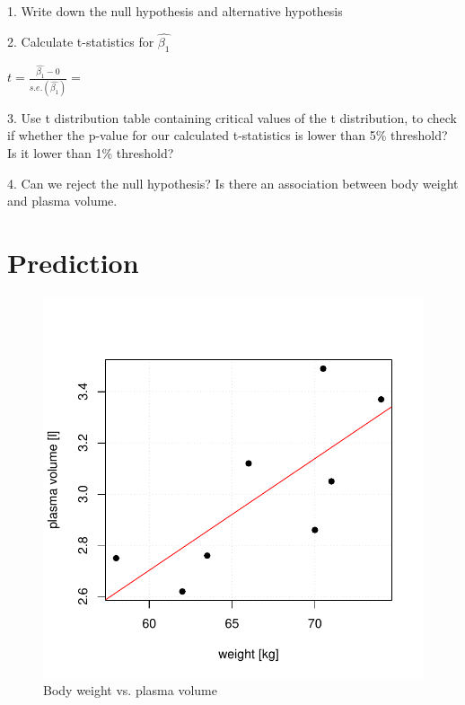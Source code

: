 \documentclass[12pt]{article}\usepackage[]{graphicx}\usepackage[]{color}
\makeatletter
\def\maxwidth{ %
  \ifdim\Gin@nat@width>\linewidth
    \linewidth
  \else
    \Gin@nat@width
  \fi
}
\newenvironment{knitrout}{}{} %
\makeatother
\begin{document}
1. Write down the null hypothesis and alternative hypothesis

2. Calculate t-statistics for $\hat{\beta_1}$ \newline

$t=\frac{\hat{\beta_1}-0}{s.e.(\hat{\beta_1})} = $
\vspace{0.2cm}

3. Use t distribution table containing critical values of the t distribution, to check if whether the p-value for our calculated t-statistics is lower than 5\% threshold? Is it lower than 1\% threshold?

4. Can we reject the null hypothesis? Is there an association between body weight and plasma volume. 

\newpage
\section{Prediction}

\begin{knitrout}
\color{fgcolor}\begin{figure}[H]

{\centering \includegraphics[width=\maxwidth]{figure/fig-prediction-1} 

}

\caption[Body weight vs]{Body weight vs. plasma volume}\label{fig:fig-prediction}
\end{figure}


\end{knitrout}
\end{document}
